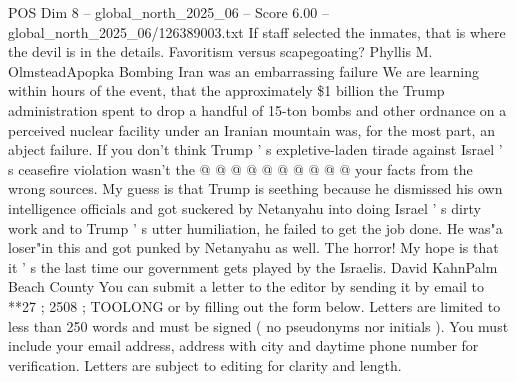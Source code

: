 \begin{textsample}{POS Dim 8 – global\_north\_2025\_06 – Score 6.00 – global\_north\_2025\_06/126389003.txt}
If staff selected the inmates, that is where the devil is in the details.
Favoritism versus scapegoating?
Phyllis M.
OlmsteadApopka Bombing Iran was an embarrassing failure We are learning within hours of the event, that the approximately \$1 billion the Trump administration spent to drop a handful of 15-ton bombs and other ordnance on a perceived nuclear facility under an Iranian mountain was, for the most part, an abject failure.
If you don't think Trump ' s expletive-laden tirade against Israel ' s ceasefire violation wasn't the @ @ @ @ @ @ @ @ @ @ your facts from the wrong sources.
My guess is that Trump is seething because he dismissed his own intelligence officials and got suckered by Netanyahu into doing Israel ' s dirty work and to Trump ' s utter humiliation, he failed to get the job done.
He was"a loser"in this and got punked by Netanyahu as well.
The horror!
My hope is that it ' s the last time our government gets played by the Israelis.
David KahnPalm Beach County You can submit a letter to the editor by sending it by email to **27 ; 2508 ; TOOLONG or by filling out the form below.
Letters are limited to less than 250 words and must be signed ( no pseudonyms nor initials ).
You must include your email address, address with city and daytime phone number for verification.
Letters are subject to editing for clarity and length.

\end{textsample}
